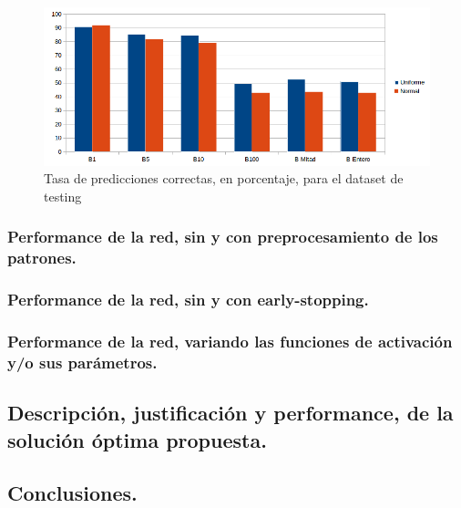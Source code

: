 \begin{figure}[h]
  \begin{center}
  \includegraphics[scale=0.75]{graficos/distribucion_eficiencia.png}
  \caption{Tasa de predicciones correctas, en porcentaje, para el dataset de testing}
  \end{center}
\end{figure}



\subsubsection{Performance de la red, sin y con preprocesamiento de los patrones.}

\subsubsection{Performance de la red, sin y con early-stopping.}

\subsubsection{Performance de la red, variando las funciones de activación y/o sus parámetros.}


\subsection{Descripción, justificación y performance, de la solución óptima propuesta.}


\subsection{Conclusiones.}